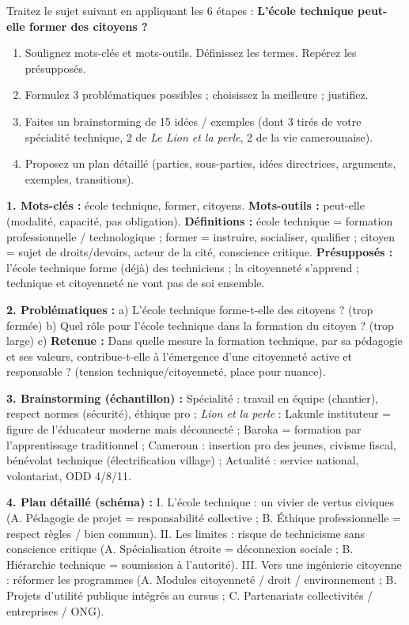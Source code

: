 \documentclass[11pt]{article}
\begin{document}
\begin{exercice}
Traitez le sujet suivant en appliquant les 6 étapes : \og \textbf{L'école technique peut-elle former des citoyens ?} \fg
\begin{enumerate}
\item Soulignez mots-clés et mots-outils. Définissez les termes. Repérez les présupposés.
\item Formulez 3 problématiques possibles ; choisissez la meilleure ; justifiez.
\item Faites un brainstorming de 15 idées / exemples (dont 3 tirés de votre spécialité technique, 2 de \emph{Le Lion et la perle}, 2 de la vie camerounaise).
\item Proposez un plan détaillé (parties, sous-parties, idées directrices, arguments, exemples, transitions).
\end{enumerate}
\end{exercice}

\begin{corrige}
\textbf{1. Mots-clés :} école technique, former, citoyens. \textbf{Mots-outils :} peut-elle (modalité, capacité, pas obligation). \textbf{Définitions :} école technique = formation professionnelle / technologique ; former = instruire, socialiser, qualifier ; citoyen = sujet de droits/devoirs, acteur de la cité, conscience critique. \textbf{Présupposés :} l'école technique forme (déjà) des techniciens ; la citoyenneté s'apprend ; technique et citoyenneté ne vont pas de soi ensemble.

\textbf{2. Problématiques :} a) L'école technique forme-t-elle des citoyens ? (trop fermée) b) Quel rôle pour l'école technique dans la formation du citoyen ? (trop large) c) \textbf{Retenue :} \og Dans quelle mesure la formation technique, par sa pédagogie et ses valeurs, contribue-t-elle à l'émergence d'une citoyenneté active et responsable ? \fg (tension technique/citoyenneté, place pour nuance).

\textbf{3. Brainstorming (échantillon) :} Spécialité : travail en équipe (chantier), respect normes (sécurité), éthique pro ; \emph{Lion et la perle} : Lakunle instituteur = figure de l'éducateur moderne mais déconnecté ; Baroka = formation par l'apprentissage traditionnel ; Cameroun : insertion pro des jeunes, civisme fiscal, bénévolat technique (électrification village) ; Actualité : service national, volontariat, ODD 4/8/11.

\textbf{4. Plan détaillé (schéma) :} I. L'école technique : un vivier de vertus civiques (A. Pédagogie de projet = responsabilité collective ; B. Éthique professionnelle = respect règles / bien commun). II. Les limites : risque de technicisme sans conscience critique (A. Spécialisation étroite = déconnexion sociale ; B. Hiérarchie technique = soumission à l'autorité). III. Vers une ingénierie citoyenne : réformer les programmes (A. Modules citoyenneté / droit / environnement ; B. Projets d'utilité publique intégrés au cursus ; C. Partenariats collectivités / entreprises / ONG).
\end{corrige}
\end{document}
